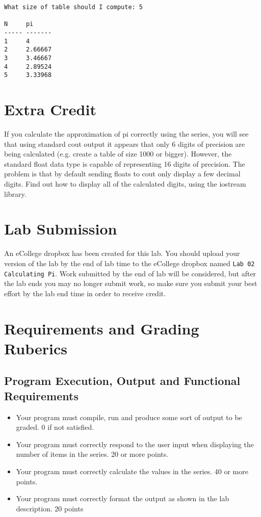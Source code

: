 \documentclass[11pt]{article}
\begin{document}
\begin{verbatim}
What size of table should I compute: 5

N     pi
----- -------
1     4
2     2.66667
3     3.46667
4     2.89524
5     3.33968
\end{verbatim}
\section*{Extra Credit}
\label{sec-4}

If you calculate the approximation of pi correctly using the series,
you will see that using standard cout output it appears that only 6
digits of precision are being calculated (e.g. create a table of size
1000 or bigger).  However, the standard float data type is capable of
representing 16 digits of precision.  The problem is that by default
sending floats to cout only display a few decimal digits.  Find out
how to display all of the calculated digits, using the iostream
library.
\section*{Lab Submission}
\label{sec-5}


An eCollege dropbox has been created for this lab.  You should
upload your version of the lab by the end of lab time to the eCollege
dropbox named \verb~Lab 02 Calculating Pi~.  Work submitted by the end
of lab will be considered, but after the lab ends you may no longer
submit work, so make sure you submit your best effort by the lab end
time in order to receive credit.
\section*{Requirements and Grading Ruberics}
\label{sec-6}
\subsection*{Program Execution, Output and Functional Requirements}
\label{sec-6-1}


\begin{itemize}
\item Your program must compile, run and produce some sort of output to be
  graded.  0 if not satisfied.
\item Your program must correctly respond to the user input when displaying
  the number of items in the series.  20 or more points.
\item Your program must correctly calculate the values in the series. 40 or 
  more points.
\item Your program must correctly format the output as shown in the lab
  description.  20 points
\end{itemize}
\end{document}
